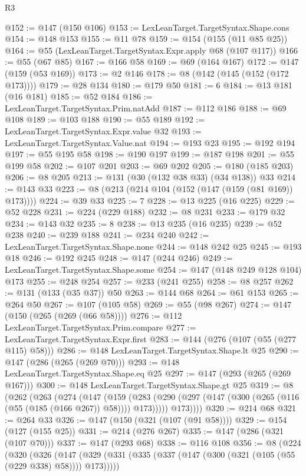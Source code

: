 \begin{lexlean}{R3}
\begin{coremodule}
@152 := @147 (@150 @106)
@153 := LexLeanTarget.TargetSyntax.Shape.cons
@154 := @148 @153
@155 := @11 @78
@159 := @154 (@155 (@11 @85 @25))
@164 := @55 (LexLeanTarget.TargetSyntax.Expr.apply @68 (@107 @117))
@166 := @55 (@67 @85)
@167 := @166 @58
@169 := @69 (@164 @167)
@172 := @147 (@159 (@53 @169))
@173 := @2 @146
@178 := @8 (@142 (@145 (@152 (@172 @173))))
@179 := @28 @134
@180 := @179 @50
@181 := 6
@184 := @13 @181 (@16 @181)
@185 := @52 @184
@186 := LexLeanTarget.TargetSyntax.Prim.natAdd
@187 := @112 @186
@188 := @69 @108
@189 := @103 @188
@190 := @55 @189
@192 := LexLeanTarget.TargetSyntax.Expr.value @32
@193 := LexLeanTarget.TargetSyntax.Value.nat
@194 := @193 @23
@195 := @192 @194
@197 := @55 @195 @58
@198 := @190 @197
@199 := @187 @198
@201 := @55 @199 @58
@202 := @107 @201
@203 := @69 @202
@205 := @180 (@185 @203)
@206 := @8 @205
@213 := @131 (@30 (@132 @38 @33) (@34 @138)) @33
@214 := @143 @33
@223 := @8 (@213 (@214 @104 (@152 (@147 (@159 (@81 @169)) @173))))
@224 := @39 @33
@225 := 7
@228 := @13 @225 (@16 @225)
@229 := @52 @228
@231 := @224 (@229 @188)
@232 := @8 @231
@233 := @179 @32
@234 := @143 @32
@235 := 8
@238 := @13 @235 (@16 @235)
@239 := @52 @238
@240 := @239 @188
@241 := @234 @240
@242 := LexLeanTarget.TargetSyntax.Shape.none
@244 := @148 @242 @25
@245 := @193 @18
@246 := @192 @245
@248 := @147 (@244 @246)
@249 := LexLeanTarget.TargetSyntax.Shape.some
@254 := @147 (@148 @249 @128 @104) @173
@255 := @248 @254
@257 := @233 (@241 @255)
@258 := @8 @257
@262 := @131 (@133 (@35 @37)) @50
@263 := @144 @68
@264 := @61 @153
@265 := @264 @50
@267 := @107 (@105 @58)
@269 := @55 (@98 @267)
@274 := @147 (@150 (@265 (@269 (@66 @58))))
@276 := @112 LexLeanTarget.TargetSyntax.Prim.compare
@277 := LexLeanTarget.TargetSyntax.Expr.first
@283 := @144 (@276 (@107 (@55 (@277 @115) @58)))
@286 := @148 LexLeanTarget.TargetSyntax.Shape.lt @25
@290 := @147 (@286 (@265 (@269 @70)))
@293 := @148 LexLeanTarget.TargetSyntax.Shape.eq @25
@297 := @147 (@293 (@265 (@269 @167)))
@300 := @148 LexLeanTarget.TargetSyntax.Shape.gt @25
@319 := @8
    (@262
      (@263
        (@274
          (@147
            (@159
              (@283 (@290 (@297 (@147 (@300 (@265 (@116 (@55 (@185 (@166 @267)) @58)))) @173)))))
            @173))))
@320 := @214 @68
@321 := @264 @33
@326 := @147 (@150 (@321 (@107 (@91 @58))))
@329 := @154 (@127 (@155 @25))
@331 := @214 (@276 @267)
@335 := @147 (@286 (@321 (@107 @70)))
@337 := @147 (@293 @68)
@338 := @116 @108
@356 := @8
    (@224
      (@320
        (@326
          (@147
            (@329 (@331 (@335 (@337 (@147 (@300 (@321 (@105 (@55 (@229 @338) @58)))) @173)))))

\end{coremodule}
\end{lexlean}
